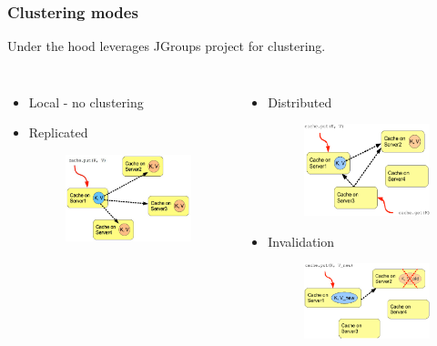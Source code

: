 \documentclass[10pt,utf8]{beamer}
\begin{document}
\begin{frame}
	\frametitle{Clustering modes}
	Under the hood leverages JGroups project for clustering.
	\begin{columns}
		\begin{itemize}
			\item Local - no clustering
			\vspace{3cm}
			\item Replicated
			\begin{figure}
				\includegraphics[width=4cm]{./img/ispn-repl.eps}
			\end{figure}
		\end{itemize}
		\begin{itemize}
			\item Distributed
			\begin{figure}
				\includegraphics[width=4cm]{./img/ispn-dist.eps}
			\end{figure}
			\item Invalidation
			\begin{figure}
				\includegraphics[width=4cm]{./img/ispn-inval.eps}
			\end{figure}
		\end{itemize}
	\end{columns}
\end{frame}
\end{document}
